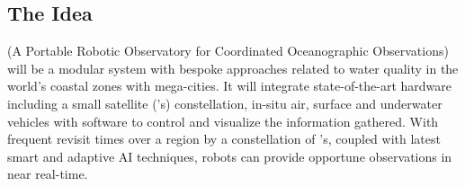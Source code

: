 \documentclass[12pt]{article}
\begin{document}
\subsection{The Idea}

\pro (A Portable Robotic Observatory for Coordinated Oceanographic
Observations) will be a modular system with bespoke approaches related
to water quality in the world's coastal zones with mega-cities. It
will integrate state-of-the-art hardware including a small satellite
(\smle's) constellation, in-situ air, surface and underwater vehicles
with software to control and visualize the information gathered. With
frequent revisit times over a region by a constellation of \smle's,
coupled with latest smart and adaptive AI techniques, robots can
provide opportune observations in near real-time.



\end{document}
